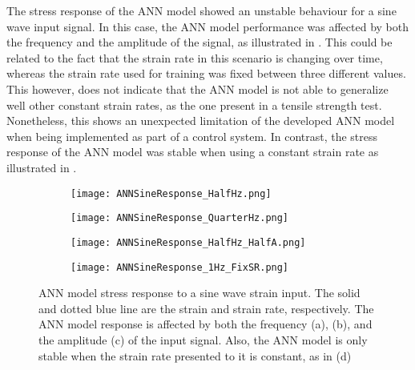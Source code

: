 The stress response of the ANN model showed an unstable behaviour for a sine wave input signal. In this case, the ANN model performance was affected by both the frequency and the amplitude of the signal, as illustrated in . This could be related to the fact that the strain rate in this scenario is changing over time, whereas the strain rate used for training was fixed between three different values. This however, does not indicate that the ANN model is not able to generalize well other constant strain rates, as the one present in a tensile strength test. Nonetheless, this shows an unexpected limitation of the developed ANN model when being implemented as part of a control system. In contrast, the stress response of the ANN model was stable when using a constant strain rate as illustrated in .

\begin{figure}[htb!]
	\centering
    \begin{subfigure}[b]{0.49\textwidth}
        \centering
        \texttt{[image: ANNSineResponse\_HalfHz.png]}
        \caption{}
        \label{fig:ANNSineTesta}
    \end{subfigure}
    \begin{subfigure}[b]{0.49\textwidth}
        \centering
        \texttt{[image: ANNSineResponse\_QuarterHz.png]}
        \caption{}
        \label{fig:ANNSineTestb}
    \end{subfigure}
    \begin{subfigure}[b]{0.49\textwidth}
        \centering
        \texttt{[image: ANNSineResponse\_HalfHz\_HalfA.png]}
        \caption{}
        \label{fig:ANNSineTestc}
    \end{subfigure}
    \begin{subfigure}[b]{0.49\textwidth}
        \centering
        \texttt{[image: ANNSineResponse\_1Hz\_FixSR.png]}
        \caption{}
        \label{fig:ANNSineTestd}
    \end{subfigure}
    \caption{ANN model stress response to a sine wave strain input. The solid and dotted blue line are the strain and strain rate, respectively. The ANN model response is affected by both the frequency (a), (b), and the amplitude (c) of the input signal. Also, the ANN model is only stable when the strain rate presented to it is constant, as in (d)}
    \label{fig:ANNSineTest}
\end{figure}

